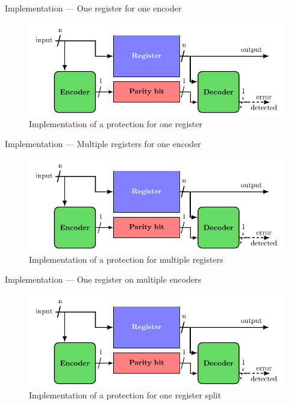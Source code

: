 \begin{frame}{Implementation — One register for one encoder}
    \begin{figure}
        \centering
        \includegraphics[width=.75\textwidth, page=1]{src/4_strategies/img/archi_contremesures.pdf}
        \caption{Implementation of a protection for one register}
        \label{fig:simple_parity_implem}
    \end{figure}
\end{frame}

\begin{frame}{Implementation — Multiple registers for one encoder}
    \begin{figure}
        \centering
        \includegraphics[width=.8\textwidth, page=4]{src/4_strategies/img/archi_contremesures.pdf}
        \caption{Implementation of a protection for multiple registers}
        \label{fig:secded_implem_independant_register}
    \end{figure}
\end{frame}

\begin{frame}{Implementation — One register on multiple encoders}
    \begin{figure}
        \centering
        \includegraphics[width=.9\textwidth, page=6]{src/4_strategies/img/archi_contremesures.pdf}
        \caption{Implementation of a protection for one register split}
        \label{fig:secded_implem_splitted}
    \end{figure}
\end{frame}

